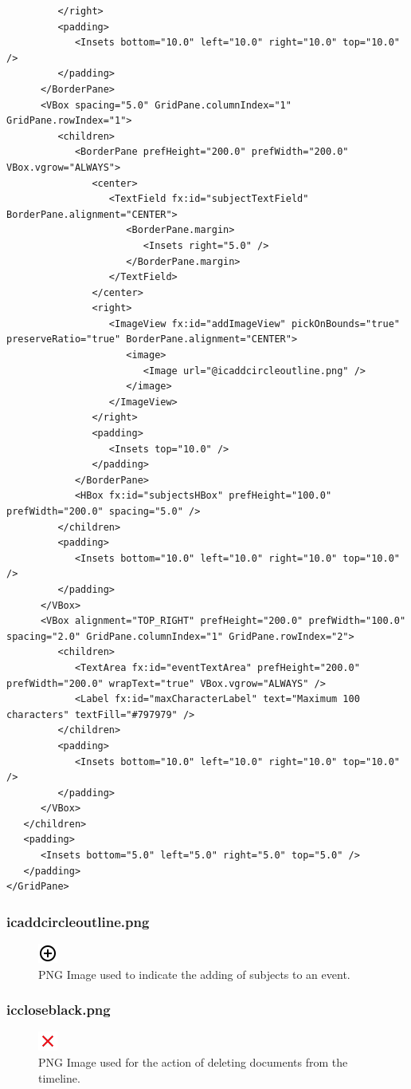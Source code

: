 \begin{lstlisting}
         </right>
         <padding>
            <Insets bottom="10.0" left="10.0" right="10.0" top="10.0" />
         </padding>
      </BorderPane>
      <VBox spacing="5.0" GridPane.columnIndex="1" GridPane.rowIndex="1">
         <children>
            <BorderPane prefHeight="200.0" prefWidth="200.0" VBox.vgrow="ALWAYS">
               <center>
                  <TextField fx:id="subjectTextField" BorderPane.alignment="CENTER">
                     <BorderPane.margin>
                        <Insets right="5.0" />
                     </BorderPane.margin>
                  </TextField>
               </center>
               <right>
                  <ImageView fx:id="addImageView" pickOnBounds="true" preserveRatio="true" BorderPane.alignment="CENTER">
                     <image>
                        <Image url="@icaddcircleoutline.png" />
                     </image>
                  </ImageView>
               </right>
               <padding>
                  <Insets top="10.0" />
               </padding>
            </BorderPane>
            <HBox fx:id="subjectsHBox" prefHeight="100.0" prefWidth="200.0" spacing="5.0" />
         </children>
         <padding>
            <Insets bottom="10.0" left="10.0" right="10.0" top="10.0" />
         </padding>
      </VBox>
      <VBox alignment="TOP_RIGHT" prefHeight="200.0" prefWidth="100.0" spacing="2.0" GridPane.columnIndex="1" GridPane.rowIndex="2">
         <children>
            <TextArea fx:id="eventTextArea" prefHeight="200.0" prefWidth="200.0" wrapText="true" VBox.vgrow="ALWAYS" />
            <Label fx:id="maxCharacterLabel" text="Maximum 100 characters" textFill="#797979" />
         </children>
         <padding>
            <Insets bottom="10.0" left="10.0" right="10.0" top="10.0" />
         </padding>
      </VBox>
   </children>
   <padding>
      <Insets bottom="5.0" left="5.0" right="5.0" top="5.0" />
   </padding>
</GridPane>
\end{lstlisting}
\subsubsection{icaddcircleoutline.png}
\begin{figure}
\caption{PNG Image used to indicate the adding of subjects to an event.}
\includegraphics{icaddcircleoutline.png}
\centering
\end{figure}
\subsubsection{iccloseblack.png}
\begin{figure}
\caption{PNG Image used for the action of deleting documents from the timeline.}
\includegraphics{iccloseblack.png}
\centering
\end{figure}
